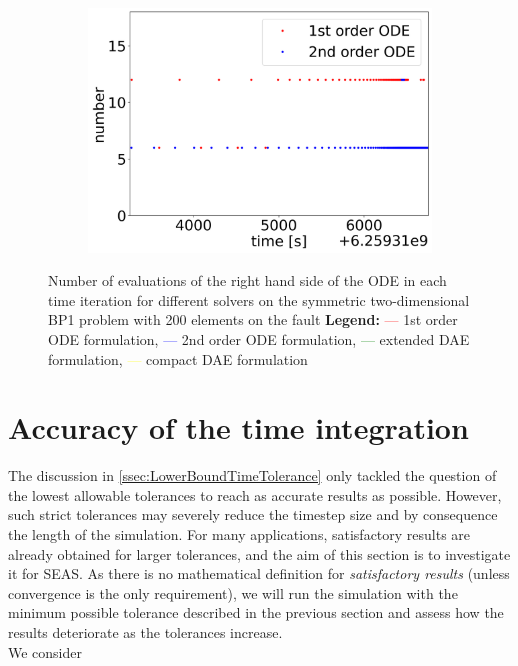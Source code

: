 \begin{figure}[H]
\begin{subfigure}{0.32\textwidth}
    	\includegraphics[width=1\textwidth]{images/TANDEMcompareFormulationstimeEvolutionRHSearthquake.png}
    \end{subfigure}
    \caption{Number of evaluations of the right hand side of the ODE in each time iteration for different solvers on the symmetric two-dimensional BP1 problem with 200 elements on the fault \newline
    \textbf{Legend:} \textcolor{red}{---} 1st order ODE formulation, \textcolor{blue}{---} 2nd order ODE formulation, \textcolor{green}{---} extended DAE formulation, \textcolor{yellow}{---} compact DAE formulation }
    \label{fig:timeEvolutionTANDEM_RHS}
\end{figure}


\section{Accuracy of the time integration}
The discussion in \autoref{ssec:LowerBoundTimeTolerance} only tackled the question of the lowest allowable tolerances to reach as accurate results as possible. However, such strict tolerances may severely reduce the timestep size and by consequence the length of the simulation. For many applications, satisfactory results are already obtained for larger tolerances, and the aim of this section is to investigate it for SEAS. As there is no mathematical definition for \textit{satisfactory results} (unless convergence is the only requirement), we will run the simulation with the minimum possible tolerance described in the previous section and assess how the results deteriorate as the tolerances increase. \\
We consider 


